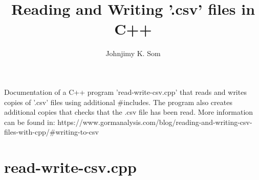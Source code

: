 \documentclass[a4paper]{article}
\title{Reading and Writing '.csv' files in C++}
\author{Johnjimy K. Som}
\begin{document}
	\maketitle
	
	\begin{scriptsize}%
		Documentation of a C++ program 'read-write-csv.cpp' that reads and writes copies of '.csv' files using additional #includes. The program also creates additional copies that checks that the .csv file has been read. More information can be found in: https://www.gormanalysis.com/blog/reading-and-writing-csv-files-with-cpp/#writing-to-csv
	\end{scriptsize}%
	
	\section{read-write-csv.cpp}
\end{document}
